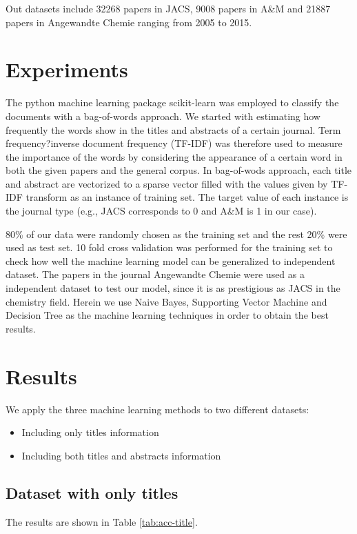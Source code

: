\documentclass[conference]{IEEEtran}
\begin{document}
Out datasets include 32268 papers in JACS, 9008 papers in A\&M and 21887 papers in Angewandte Chemie ranging from 2005 to 2015.

\section{Experiments}

The python machine learning package scikit-learn was employed to classify the documents with a bag-of-words approach. We started with estimating how frequently the words show in the titles and abstracts of a certain journal. Term frequency?inverse document frequency (TF-IDF) was therefore used to measure the importance of the words by considering the appearance of a certain word in both the given papers and the general corpus. In bag-of-wods approach, each title and abstract are vectorized to a sparse vector filled with the values given by TF-IDF transform as an instance of training set. The target value of each instance is the journal type (e.g., JACS corresponds to 0 and A\&M is 1 in our case).

80\% of our data were randomly chosen as the training set and the rest 20\% were used as test set. 10 fold cross validation was performed for the training set to check how well the machine learning model can be generalized to independent dataset. The papers in the journal Angewandte Chemie were used as a independent dataset to test our model, since it is as prestigious as JACS in the chemistry field. Herein we use Naive Bayes, Supporting Vector Machine and Decision Tree as the machine learning techniques in order to obtain the best results.

\section{Results}
We apply the three machine learning methods to two different datasets:

\begin{itemize}
    \item{Including only titles information}
    \item{Including both titles and abstracts information}
\end{itemize}

\subsection{Dataset with only titles}
The results are shown in Table \ref{tab:acc-title}.
\end{document}
